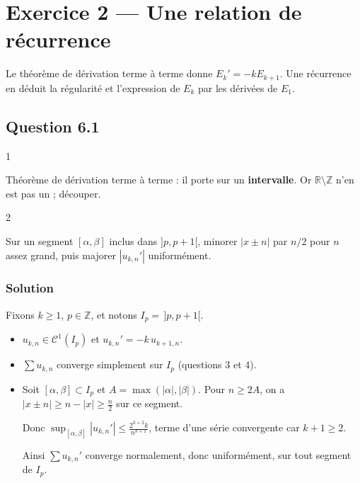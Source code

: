 \documentclass[11pt,a4paper]{article}
\begin{document}
\hypertarget{exercice-2-une-relation-de-ruxe9currence}{%
\section{Exercice 2 --- Une relation de récurrence}\label{exercice-2-une-relation-de-ruxe9currence}}

Le théorème de dérivation terme à terme donne \(E_k'=-kE_{k+1}\). Une récurrence en déduit la régularité et l'expression de \(E_k\) par les dérivées de \(E_1\).

\hypertarget{question-6.1}{%
\subsection{Question 6.1}\label{question-6.1}}

\begin{indication}{1}

Théorème de dérivation terme à terme : il porte sur un \textbf{intervalle}. Or \(\mathbb R\setminus\mathbb Z\) n'en est pas un ; découper.

\end{indication}

\begin{indication}{2}

Sur un segment \([\alpha,\beta]\) inclus dans \(]p,p+1[\), minorer \(|x\pm n|\) par \(n/2\) pour \(n\) assez grand, puis majorer \(|u_{k,n}'|\) uniformément.

\end{indication}

\hypertarget{solution-24}{%
\subsubsection{Solution}\label{solution-24}}

Fixons \(k\ge1\), \(p\in\mathbb Z\), et notons \(I_p=\,]p,p+1[\).

\begin{itemize}
\item
  \(u_{k,n}\in\mathcal C^1(I_p)\) et \(u_{k,n}'=-k\,u_{k+1,n}\).
\item
  \(\sum u_{k,n}\) converge simplement sur \(I_p\) (questions 3 et 4).
\item
  Soit \([\alpha,\beta]\subset I_p\) et \(A=\max(|\alpha|,|\beta|)\). Pour \(n\ge2A\), on a \(|x\pm n|\ge n-|x|\ge\frac n2\) sur ce segment.

  Donc \(\sup_{[\alpha,\beta]}|u_{k,n}'|\le\frac{2^{k+2}k}{n^{k+1}}\), terme d'une série convergente car \(k+1\ge2\).

  Ainsi \(\sum u_{k,n}'\) converge normalement, donc uniformément, sur tout segment de \(I_p\).
\end{itemize}
\end{document}
